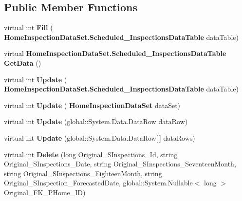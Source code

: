 \subsection*{Public Member Functions}
\begin{DoxyCompactItemize}
\item 
\mbox{\label{class_a_f_h___scheduler_1_1_home_inspection_data_set_table_adapters_1_1_scheduled___inspections_table_adapter_a563ccd48a3ffd73b05dc523c8196c172}} 
virtual int {\bfseries Fill} (\textbf{ Home\+Inspection\+Data\+Set.\+Scheduled\+\_\+\+Inspections\+Data\+Table} data\+Table)
\item 
\mbox{\label{class_a_f_h___scheduler_1_1_home_inspection_data_set_table_adapters_1_1_scheduled___inspections_table_adapter_af11b49d430b88ffdbd1a448680786d2a}} 
virtual \textbf{ Home\+Inspection\+Data\+Set.\+Scheduled\+\_\+\+Inspections\+Data\+Table} {\bfseries Get\+Data} ()
\item 
\mbox{\label{class_a_f_h___scheduler_1_1_home_inspection_data_set_table_adapters_1_1_scheduled___inspections_table_adapter_a1d592d114e910ef8743cf85771021c03}} 
virtual int {\bfseries Update} (\textbf{ Home\+Inspection\+Data\+Set.\+Scheduled\+\_\+\+Inspections\+Data\+Table} data\+Table)
\item 
\mbox{\label{class_a_f_h___scheduler_1_1_home_inspection_data_set_table_adapters_1_1_scheduled___inspections_table_adapter_a25f16c734a7141bf851a3104f9e24f26}} 
virtual int {\bfseries Update} (\textbf{ Home\+Inspection\+Data\+Set} data\+Set)
\item 
\mbox{\label{class_a_f_h___scheduler_1_1_home_inspection_data_set_table_adapters_1_1_scheduled___inspections_table_adapter_aaf975ed63a7e7eebf04a1bd8e4c6be79}} 
virtual int {\bfseries Update} (global\+::\+System.\+Data.\+Data\+Row data\+Row)
\item 
\mbox{\label{class_a_f_h___scheduler_1_1_home_inspection_data_set_table_adapters_1_1_scheduled___inspections_table_adapter_a5303a52bdf6bb3529a49deebb26dc0e9}} 
virtual int {\bfseries Update} (global\+::\+System.\+Data.\+Data\+Row[$\,$] data\+Rows)
\item 
\mbox{\label{class_a_f_h___scheduler_1_1_home_inspection_data_set_table_adapters_1_1_scheduled___inspections_table_adapter_ac3a863e072bc20fee5b43ddde3c93c38}} 
virtual int {\bfseries Delete} (long Original\+\_\+\+S\+Inspections\+\_\+\+Id, string Original\+\_\+\+S\+Inspections\+\_\+\+Date, string Original\+\_\+\+S\+Inspections\+\_\+\+Seventeen\+Month, string Original\+\_\+\+S\+Inspections\+\_\+\+Eighteen\+Month, string Original\+\_\+\+S\+Inspection\+\_\+\+Forecasted\+Date, global\+::\+System.\+Nullable$<$ long $>$ Original\+\_\+\+F\+K\+\_\+\+P\+Home\+\_\+\+ID)

\end{DoxyCompactItemize}
